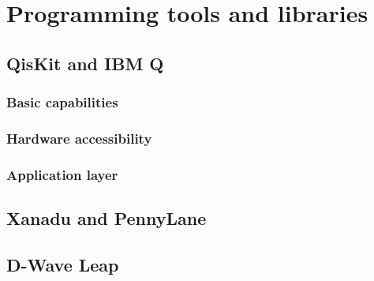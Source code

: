 \chapter{Programming tools and libraries}


\section{QisKit and IBM Q}

\subsection{Basic capabilities}

\subsection{Hardware accessibility}

\subsection{Application layer}


\section{Xanadu and PennyLane}



\section{D-Wave Leap}




